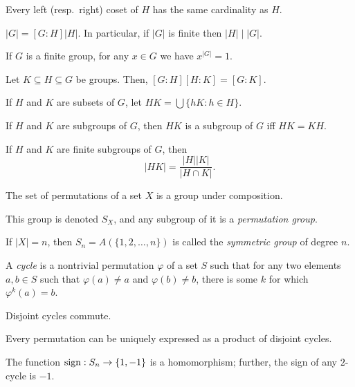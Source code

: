 \begin{prop}
    Every left (resp.\ right) coset of $H$ has the same cardinality as $H$.
\end{prop}
\begin{cor}
    $|G|=[G:H]|H|$. In particular, if $|G|$ is finite then $|H|\mid|G|$.
\end{cor}
\begin{cor}
    If $G$ is a finite group, for any $x\in G$ we have $x^{|G|}=1$.
\end{cor}
\begin{prop}
    Let $K\subseteq H\subseteq G$ be groups. Then, $[G:H][H:K]=[G:K]$.
\end{prop}
\begin{defn}
    If $H$ and $K$ are subsets of $G$, let $HK=\bigcup\{hK:h\in H\}$.
\end{defn}
\begin{prop}
    If $H$ and $K$ are subgroups of $G$, then $HK$ is a subgroup of $G$ iff $HK=KH$.
\end{prop}
\begin{prop}
    If $H$ and $K$ are finite subgroups of $G$, then
    \[|HK|=\frac{|H||K|}{|H\cap K|}.\]
\end{prop}
\begin{prop}
    The set of permutations of a set $X$ is a group under composition.
\end{prop}
\begin{defn}
    This group is denoted $S_X$, and any subgroup of it is a \emph{permutation
    group}.

    If $|X|=n$, then $S_n=A(\{1,2,\ldots,n\})$ is called the \emph{symmetric
    group} of degree $n$.
\end{defn}
\begin{defn}
    A \emph{cycle} is a nontrivial permutation $\varphi$ of a set $S$ such that for
    any two elements $a,b\in S$ such that $\varphi(a)\ne a$ and $\varphi(b)\ne
    b$, there is some $k$ for which $\varphi^k(a)=b$.
\end{defn}
\begin{prop}
    Disjoint cycles commute.
\end{prop}
\begin{prop}
    Every permutation can be uniquely expressed as a product of disjoint cycles.
\end{prop}
\begin{prop}
    The function $\mathrm{sign}:S_n\to\{1,-1\}$ is a homomorphism; further, the sign of
    any $2$-cycle is $-1$.
\end{prop}
